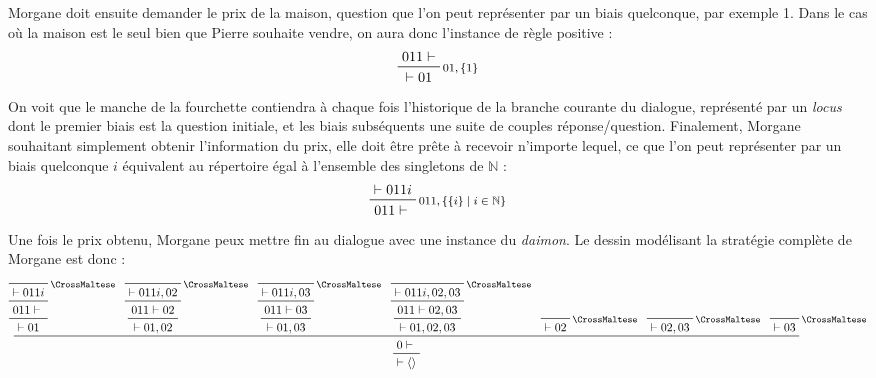 \documentclass[11pt]{report}
\newcommand{\dai}{\text{\CrossMaltese}}
\newcommand{\seq}{\vdash}
\newcommand{\irule}[1]{\footnotesize$#1$}
\begin{document}
Morgane doit ensuite demander le prix de la maison, question que l'on peut représenter par un biais quelconque, par exemple 1. Dans le cas où la maison est le seul bien que Pierre souhaite vendre, on aura donc l'instance de règle positive :
\begin{displaymath}
    \prftree[r]{\irule{01,\{1\}}}
        {011 \seq}
        {\seq 01}
\end{displaymath}
On voit que le manche de la fourchette contiendra à chaque fois l'historique de la branche courante du dialogue, représenté par un \textit{locus} dont le premier biais est la question initiale, et les biais subséquents une suite de couples réponse/question. Finalement, Morgane souhaitant simplement obtenir l'information du prix, elle doit être prête à recevoir n'importe lequel, ce que l'on peut représenter par un biais quelconque $i$ équivalent au répertoire égal à l'ensemble des singletons de $\mathbb{N}$ : 
\begin{displaymath}
    \prftree[r]{\irule{011,\{\{i\} \mid i \in \mathbb{N}\}}}
        {\seq 011i}
        {011 \seq}
\end{displaymath}
Une fois le prix obtenu, Morgane peux mettre fin au dialogue avec une instance du \textit{daimon}. Le dessin modélisant la stratégie complète de Morgane est donc :
\begin{displaymath}
    \prftree
        {\prftree
            {\prftree
                {\prftree
                    {\prfbyaxiom{\irule{\dai}}{\seq 011i}}
                    {011 \seq}}
                {\seq 01}}
            {\prftree
                {\prftree
                    {\prfbyaxiom{\irule{\dai}}{\seq 011i,02}}
                    {011 \seq 02}}
                {\seq 01,02}}
            {\prftree
                {\prftree
                    {\prfbyaxiom{\irule{\dai}}{\seq 011i,03}}
                    {011 \seq 03}}
                {\seq 01,03}}
            {\prftree
                {\prftree
                    {\prfbyaxiom{\irule{\dai}}{\seq 011i,02,03}}
                    {011 \seq 02,03}}
                {\seq 01,02,03}}
            {\prfbyaxiom{\irule{\dai}}{\seq 02}}
            {\prfbyaxiom{\irule{\dai}}{\seq 02,03}}
            {\prfbyaxiom{\irule{\dai}}{\seq 03}}
            {0 \seq}}
        {\seq \langle\rangle}
\end{displaymath}

\end{document}

